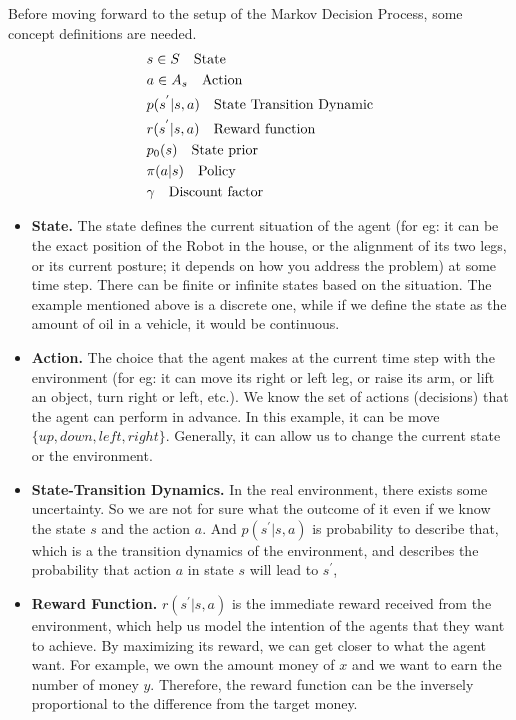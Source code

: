 \documentclass[11pt]{article}
\begin{document}
Before moving forward to the setup of the Markov Decision Process, some concept definitions are needed.
\begin{align*}
    \centering
    & s \in S \quad \textrm{State} \\
    & a \in A_s \quad \textrm{Action} \\
    & p(s^{'} |s, a) \quad \textrm{State Transition Dynamic} \\
    & r(s^{'} |s, a) \quad \textrm{Reward function} \\
    & p_0(s) \quad \textrm{State prior} \\
    & \pi (a|s) \quad \textrm{Policy} \\
    & \gamma \quad \textrm{Discount factor}
\end{align*}
\begin{itemize}
    \item \textbf{State.} The state defines the current situation of the agent (for eg: it can be the exact position of the Robot in the house, or the alignment of its two legs, or its current posture; it depends on how you address the problem) at some time step. There can be finite or infinite states based on the situation. The example mentioned above is a discrete one, while if we define the state as the amount of oil in a vehicle, it would be continuous.
    
    \item \textbf{Action.} The choice that the agent makes at the current time step with the environment (for eg: it can move its right or left leg, or raise its arm, or lift an object, turn right or left, etc.). We know the set of actions (decisions) that the agent can perform in advance. In this example, it can be move $\{up, down, left, right\}$. Generally, it can allow us to change the current state or the environment.
    
    \item \textbf{State-Transition Dynamics.} In the real environment, there exists some uncertainty. So we are not for sure what the outcome of it even if we know the state $s$ and the action $a$. And $p(s^{'} |s, a)$ is probability to describe that, which is a the transition dynamics of the environment, and describes the probability that action $a$ in state $s$ will lead to $s^{'}$,

    \item \textbf{Reward Function.} $r(s^{'} |s, a)$ is the immediate reward received from the environment, which help us model the intention of the agents that they want to achieve. By maximizing its reward, we can get closer to what the agent want. For example, we own the amount money of $x$ and we want to earn the number of money $y$. Therefore, the reward function can be the inversely proportional to the difference from the target money.
    

\end{itemize}
\end{document}
